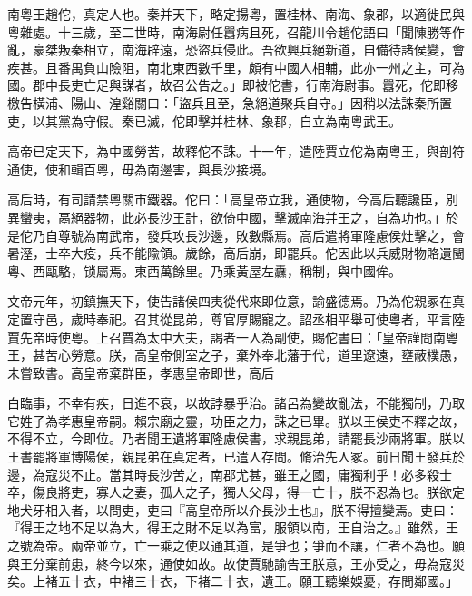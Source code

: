 \begin{pinyinscope}
南粵王趙佗，真定人也。秦并天下，略定揚粵，置桂林、南海、象郡，以適徙民與粵雜處。十三歲，至二世時，南海尉任囂病且死，召龍川令趙佗語曰「聞陳勝等作亂，豪桀叛秦相立，南海辟遠，恐盜兵侵此。吾欲興兵絕新道，自備待諸侯變，會疾甚。且番禺負山險阻，南北東西數千里，頗有中國人相輔，此亦一州之主，可為國。郡中長吏亡足與謀者，故召公告之。」即被佗書，行南海尉事。囂死，佗即移檄告橫浦、陽山、湟谿關曰：「盜兵且至，急絕道聚兵自守。」因稍以法誅秦所置吏，以其黨為守假。秦已滅，佗即擊并桂林、象郡，自立為南粵武王。

高帝已定天下，為中國勞苦，故釋佗不誅。十一年，遣陸賈立佗為南粵王，與剖符通使，使和輯百粵，毋為南邊害，與長沙接境。

高后時，有司請禁粵關巿鐵器。佗曰：「高皇帝立我，通使物，今高后聽讒臣，別異蠻夷，鬲絕器物，此必長沙王計，欲倚中國，擊滅南海并王之，自為功也。」於是佗乃自尊號為南武帝，發兵攻長沙邊，敗數縣焉。高后遣將軍隆慮侯灶擊之，會暑溼，士卒大疫，兵不能隃領。歲餘，高后崩，即罷兵。佗因此以兵威財物賂遺閩粵、西甌駱，锁屬焉。東西萬餘里。乃乘黃屋左纛，稱制，與中國侔。

文帝元年，初鎮撫天下，使告諸侯四夷從代來即位意，諭盛德焉。乃為佗親冢在真定置守邑，歲時奉祀。召其從昆弟，尊官厚賜寵之。詔丞相平舉可使粵者，平言陸賈先帝時使粵。上召賈為太中大夫，謁者一人為副使，賜佗書曰：「皇帝謹問南粵王，甚苦心勞意。朕，高皇帝側室之子，棄外奉北藩于代，道里遼遠，壅蔽樸愚，未嘗致書。高皇帝棄群臣，孝惠皇帝即世，高后

白臨事，不幸有疾，日進不衰，以故誖暴乎治。諸呂為變故亂法，不能獨制，乃取它姓子為孝惠皇帝嗣。賴宗廟之靈，功臣之力，誅之已畢。朕以王侯吏不釋之故，不得不立，今即位。乃者聞王遺將軍隆慮侯書，求親昆弟，請罷長沙兩將軍。朕以王書罷將軍博陽侯，親昆弟在真定者，已遣人存問。脩治先人冢。前日聞王發兵於邊，為寇災不止。當其時長沙苦之，南郡尤甚，雖王之國，庸獨利乎！必多殺士卒，傷良將吏，寡人之妻，孤人之子，獨人父母，得一亡十，朕不忍為也。朕欲定地犬牙相入者，以問吏，吏曰『高皇帝所以介長沙土也』，朕不得擅變焉。吏曰：『得王之地不足以為大，得王之財不足以為富，服領以南，王自治之。』雖然，王之號為帝。兩帝並立，亡一乘之使以通其道，是爭也；爭而不讓，仁者不為也。願與王分棄前患，終今以來，通使如故。故使賈馳諭告王朕意，王亦受之，毋為寇災矣。上褚五十衣，中褚三十衣，下褚二十衣，遺王。願王聽樂娛憂，存問鄰國。」


\end{pinyinscope}
